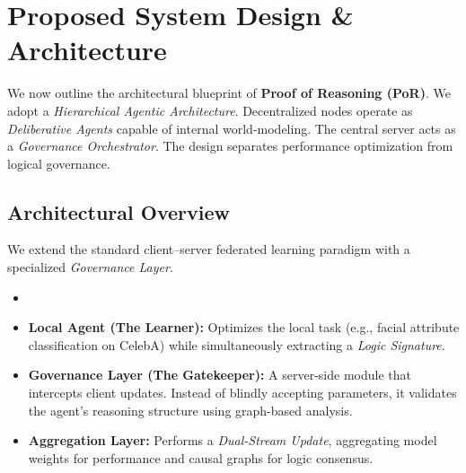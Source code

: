 \documentclass[journal]{IEEEtran}
\begin{document}
\begin{table}[H]
\centering
\caption{Research gap addressed by PoR.}
\end{table}

\newpage
\section{Proposed System Design \& Architecture}

We now outline the architectural blueprint of \textbf{Proof of Reasoning (PoR)}. We adopt a \emph{Hierarchical Agentic Architecture}. Decentralized nodes operate as \emph{Deliberative Agents} capable of internal world-modeling. The central server acts as a \emph{Governance Orchestrator}. The design separates performance optimization from logical governance.

\subsection{Architectural Overview}

We extend the standard client--server federated learning paradigm with a specialized \emph{Governance Layer}.

\begin{itemize}
\item  \item \textbf{Local Agent (The Learner):} Optimizes the local task (e.g., facial attribute classification on CelebA) while simultaneously extracting a \emph{Logic Signature}. \item \textbf{Governance Layer (The Gatekeeper):} A server-side module that intercepts client updates. Instead of blindly accepting parameters, it validates the agent’s reasoning structure using graph-based analysis. \item \textbf{Aggregation Layer:} Performs a \emph{Dual-Stream Update}, aggregating model weights for performance and causal graphs for logic consensus. \end{itemize}
\end{document}
